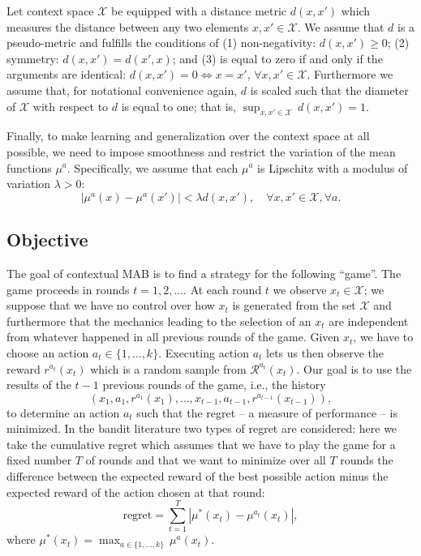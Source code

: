 \documentclass{llncs}
\begin{document}
Let context space $\mathcal X$ be equipped with a distance metric 
$d(x,x')$ which measures the distance between any two elements 
$x,x'\in \mathcal X$. We assume that $d$ is a pseudo-metric and fulfills the
conditions of (1) non-negativity: $d(x,x')\ge 0$; (2) symmetry: 
$d(x,x')=d(x',x)$; and (3) is equal to zero if and only if the arguments
are identical: $d(x,x')=0 \Leftrightarrow x=x'$, $\forall x,x'\in\mathcal X$.  
Furthermore we assume that, for notational convenience again, $d$ is scaled
such that the diameter of $\mathcal X$ with respect to $d$ is equal to 
one; that is, $\sup_{x,x'\in \mathcal X} \, d(x,x')=1$. 

Finally, to make learning and generalization over the context space at all 
possible, we need to impose smoothness and restrict the variation of the
mean functions $\mu^a$. Specifically, we assume that each $\mu^a$ is 
Lipschitz with a modulus of variation $\lambda>0$:
\begin{equation}
|\mu^a(x)-\mu^a(x')| < \lambda d(x,x'), \quad \forall x,x'\in \mathcal X, \forall a.
\label{eq:lipschitz}
\end{equation}

\subsection{Objective} 
The goal of contextual MAB is to find a strategy for the following ``game''. 
The game proceeds in rounds $t=1,2,\ldots$. At each round $t$
we observe $x_t \in \mathcal X$; we suppose that we have no control over how
$x_t$ is generated from the set $\mathcal X$ and furthermore that the 
mechanics leading to the selection of an $x_t$ are independent from 
whatever happened in all previous rounds of the game. Given $x_t$, we have
to choose an action $a_t \in \{1,\ldots,k\}$. Executing action $a_t$
lets us then observe the reward $r^{a_t}(x_t)$ which is a random sample 
from $\mathcal R^{a_t}(x_t)$. Our goal is to use the results of the $t-1$
previous rounds of the game, i.e., the history 
\[(x_1,a_1,r^{a_1}(x_1),\ldots,x_{t-1},a_{t-1},r^{a_{t-1}}(x_{t-1})),\]
to determine an action $a_t$ such that the regret -- a measure of performance --
is minimized.   
In the bandit literature two types of  regret are considered:
here we take the cumulative regret which assumes that we have to play the game 
for a fixed number $T$ of rounds
and that we want to minimize over all $T$ rounds the difference between
the expected reward of the best possible action minus
the expected reward of the action chosen at that round:
\begin{equation}
\textrm{regret}=\sum_{t=1}^T |\mu^*(x_t)-\mu^{a_t}(x_t)|, 
\label{eq:regret}
\end{equation} 
where $\mu^*(x_t)=\max_{a \in \{1,\ldots,k\}} \, \mu^a(x_t)$. 
\end{document}
